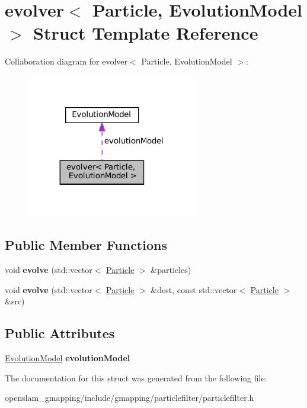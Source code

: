 \hypertarget{structevolver}{}\section{evolver$<$ Particle, Evolution\+Model $>$ Struct Template Reference}
\label{structevolver}


Collaboration diagram for evolver$<$ Particle, Evolution\+Model $>$\+:
\nopagebreak
\begin{figure}[H]
\begin{center}
\leavevmode
\includegraphics[width=212pt]{structevolver__coll__graph}
\end{center}
\end{figure}
\subsection*{Public Member Functions}
\begin{DoxyCompactItemize}
\item 
\mbox{\label{structevolver_a61f5d2b046a866f06e298e389221211c}} 
void {\bfseries evolve} (std\+::vector$<$ \hyperlink{structParticle}{Particle} $>$ \&particles)
\item 
\mbox{\label{structevolver_a61e6aa8695a0639547e2ac174a92d186}} 
void {\bfseries evolve} (std\+::vector$<$ \hyperlink{structParticle}{Particle} $>$ \&dest, const std\+::vector$<$ \hyperlink{structParticle}{Particle} $>$ \&src)
\end{DoxyCompactItemize}
\subsection*{Public Attributes}
\begin{DoxyCompactItemize}
\item 
\mbox{\label{structevolver_a68d662fa9cc8460e4353e5b2467dea3d}} 
\hyperlink{structEvolutionModel}{Evolution\+Model} {\bfseries evolution\+Model}
\end{DoxyCompactItemize}


The documentation for this struct was generated from the following file\+:\begin{DoxyCompactItemize}
\item 
openslam\+\_\+gmapping/include/gmapping/particlefilter/particlefilter.\+h\end{DoxyCompactItemize}
